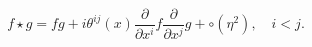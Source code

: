 \begin{equation}
f\star g=fg+i\theta ^{ij}\left( x\right) \frac{\partial }{\partial x^{i}}f%
\frac{\partial }{\partial x^{j}}g+\circ \left( \eta ^{2}\right) , \quad i<j.
\end{equation}


